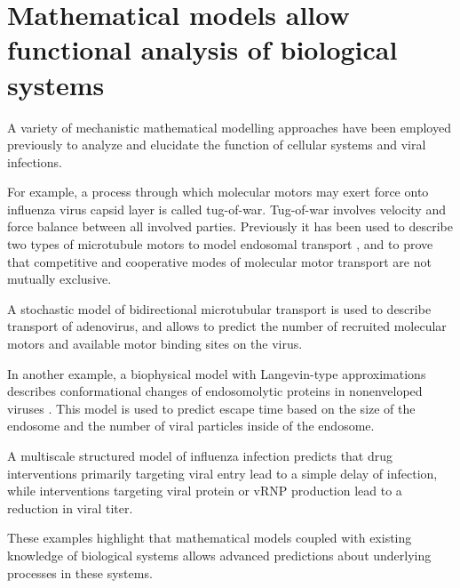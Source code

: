\section{Mathematical models allow functional analysis of biological systems}

A variety of mechanistic mathematical modelling approaches have been employed previously to analyze and elucidate the function of cellular systems and viral infections.

For example, a process through which molecular motors may exert force onto influenza virus capsid layer is called tug-of-war. Tug-of-war involves velocity and force balance between all involved parties. Previously it has been used to describe two types of microtubule motors to model endosomal transport \cite{muller2008tug}, and to prove that competitive and cooperative modes of molecular motor transport are not mutually exclusive.

A stochastic model of bidirectional microtubular transport \cite{gazzola2009stochastic} is used to describe transport of adenovirus, and allows to predict the number of recruited molecular motors and available motor binding sites on the virus.

In another example, a biophysical model with  Langevin-type approximations  describes conformational changes of endosomolytic proteins in nonenveloped viruses \cite{lagache2012modeling}. This model is used to predict escape time based on the size of the endosome and the number of viral particles inside of the endosome.

A multiscale structured model of influenza infection \cite{heldt2013multiscale} predicts that drug interventions primarily targeting viral entry lead to a simple delay of infection, while interventions targeting viral protein or vRNP  production lead to a reduction in viral titer.

These examples highlight that mathematical models coupled with existing knowledge of biological systems allows advanced predictions about underlying processes in these systems.